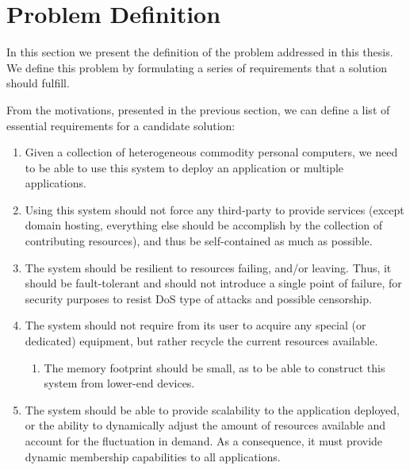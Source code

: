 \documentclass[12pt, titlepage]{uo_temp}
\begin{document}
     \section{Problem Definition} \label{int_req}
     In this section we present the definition of the problem addressed in this thesis. We
     define this problem by formulating a series of requirements that a solution should
     fulfill.

     From the motivations, presented in the previous section, we can define a list of essential
     requirements for a candidate solution:

     \begin{enumerate}[label={\bf Requirement \arabic*},
                       wide=\parindent,
                       leftmargin=\parindent,
                       rightmargin=\parindent] \label{requirements}
     \item Given a collection of heterogeneous commodity personal computers, we need to be
       able to use this system to deploy an application or multiple applications.
     \item Using this system should not force any third-party to provide services (except
       domain hosting, everything else should be accomplish by the collection of
       contributing resources), and thus be self-contained as much as possible.
     \item The system should be resilient to resources failing, and/or leaving. Thus, it
       should be fault-tolerant and should not introduce a single point of failure, for
       security purposes to resist DoS type of attacks and possible censorship.
     \item The system should not require from its user to acquire any special (or
       dedicated) equipment, but rather recycle the current resources available.
     \begin{enumerate}[label={\bf Sub-Requirement \arabic*},
                       wide=\parindent,
                       leftmargin=\parindent,
                       rightmargin=\parindent]
     \item The memory footprint should be small, as to be able to construct this
       system from lower-end devices.
     \end{enumerate}
     \item The system should be able to provide scalability to the application deployed,
       or the ability to dynamically adjust the amount of resources available and account
       for the fluctuation in demand. As a consequence, it must provide dynamic membership
       capabilities to all applications.
     \end{enumerate}
\end{document}
